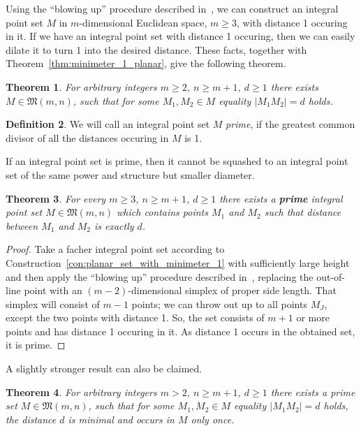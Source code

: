 \documentclass[a4paper,14pt]{article} %
\theoremstyle{plain}
\newtheorem{theorem}{Theorem}[section]
\theoremstyle{definition}
\newtheorem{definition}[theorem]{Definition}
\begin{document}
Using the ``blowing up'' procedure described in~\cite[theorem 1.3]{kurz2008bounds},
we can construct an integral point set $M$ in $m$-dimensional Euclidean space, $m\geq 3$,
with distance 1 occuring in it.
If we have an integral point set with distance 1 occuring,
then we can easily dilate it to turn 1 into the desired distance.
These facts, together with Theorem~\ref{thm:minimeter_1_planar}, give the following theorem.

\begin{theorem}
	For arbitrary integers $m \geq 2$, $n \geq m+1$, $d \geq 1$
	there exists $M\in\mathfrak{M}(m,n)$,
	such that for some $M_1, M_2\in M$ equality $|M_1 M_2| = d$ holds.
\end{theorem}


\begin{definition}
	\cite{noll1989nclusters}
	We will call an integral point set $M$ \textit{prime}, if the greatest common divisor
	of all the distances occuring in $M$ is 1.
\end{definition}

If an integral point set is prime,
then it cannot be squashed to an integral point set of the same power and structure but smaller diameter.


\begin{theorem}
	\label{thm:prime_with_desired_distance}
	For every $m \geq 3$, $n \geq m+1$, $d \geq 1$ there exists a \textbf{prime}
	integral point set $M\in\mathfrak{M}(m,n)$ which
	contains points $M_1$ and $M_2$ such that distance between $M_1$ and $M_2$ is exactly $d$.
\end{theorem}

\begin{proof}
	Take a facher integral point set according to Construction~\ref{con:planar_set_with_minimeter_1}
	with sufficiently large height and then apply the ``blowing up'' procedure described in~\cite[Theorem 1.3]{kurz2008bounds},
	replacing the out-of-line point with an $(m-2)$-dimensional simplex of proper side length.
	That simplex will consist of $m-1$ points;
	we can throw out up to all points $M_J$, except the two points with distance 1.
	So, the set consists of $m+1$ or more points and has distance 1 occuring in it.
	As distance 1 occurs in the obtained set, it is prime.
\end{proof}

A slightly stronger result can also be claimed.

\begin{theorem}
	\label{thm:prime_with_unique_desired_distance}
	For arbitrary integers $m > 2$, $n \geq m+1$, $d \geq 1$
	there exists a prime set $M\in\mathfrak{M}(m,n)$,
	such that for some $M_1, M_2\in M$ equality $|M_1 M_2| = d$ holds,
	the distance $d$ is minimal and occurs in $M$ only once.
\end{theorem}
\end{document}
